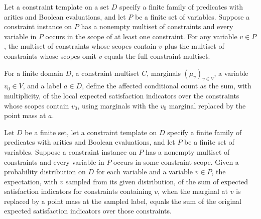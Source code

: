\begin{theorem}
\label{FABL.CSPInstance.affectedConstraints_add_unaffectedConstraints}
\leanok
{}
Let a constraint template on a set $D$ specify a finite family of predicates with
arities and Boolean evaluations, and let $P$ be a finite set of variables. Suppose a
constraint instance on $P$ has a nonempty multiset of constraints and every variable in
$P$ occurs in the scope of at least one constraint. For any variable $v\in P$, the
multiset of constraints whose scopes contain $v$ plus the multiset of constraints whose
scopes omit $v$ equals the full constraint multiset.
\end{theorem}

\begin{definition}
\label{FABL.CSPInstance.affectedConditionalCount}
\leanok
{}
For a finite domain $D$, a constraint multiset $C$, marginals $(\mu_v)_{v\in V}$, a
variable $v_0\in V$, and a label $a\in D$, define the affected conditional count as the
sum, with multiplicity, of the local expected satisfaction indicators over the
constraints whose scopes contain $v_0$, using marginals with the $v_0$ marginal replaced
by the point mass at $a$.
\end{definition}

\begin{theorem}
\label{FABL.CSPInstance.average_affectedConditionalCount}
\leanok
{}
Let $D$ be a finite set, let a constraint template on $D$ specify a finite family of
predicates with arities and Boolean evaluations, and let $P$ be a finite set of
variables. Suppose a constraint instance on $P$ has a nonempty multiset of constraints
and every variable in $P$ occurs in some constraint scope. Given a probability
distribution on $D$ for each variable and a variable $v\in P$, the expectation, with $v$
sampled from its given distribution, of the sum of expected satisfaction indicators for
constraints containing $v$, when the marginal at $v$ is replaced by a point mass at the
sampled label, equals the sum of the original expected satisfaction indicators over
those constraints.
\end{theorem}

